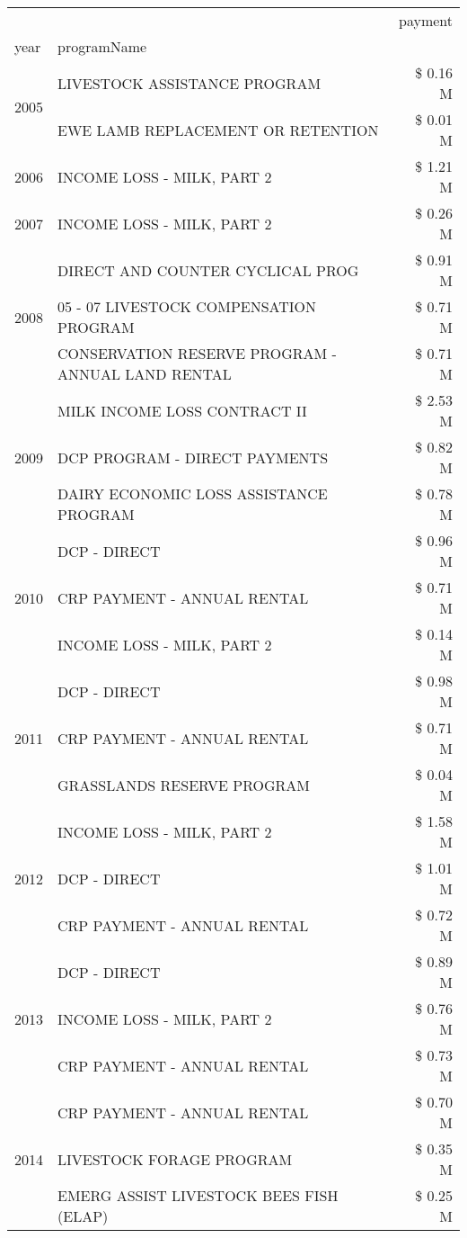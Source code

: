 \begin{tabular}{llr}
\toprule
 &  & payment \\
year & programName &  \\
\midrule
\multirow[t]{2}{*}{2005} & LIVESTOCK ASSISTANCE PROGRAM & \$ 0.16 M \\
 & EWE LAMB REPLACEMENT OR RETENTION & \$ 0.01 M \\
\cline{1-3}
2006 & INCOME LOSS - MILK, PART 2 & \$ 1.21 M \\
\cline{1-3}
2007 & INCOME LOSS - MILK, PART 2 & \$ 0.26 M \\
\cline{1-3}
\multirow[t]{3}{*}{2008} & DIRECT AND COUNTER CYCLICAL PROG & \$ 0.91 M \\
 & 05 - 07 LIVESTOCK COMPENSATION PROGRAM & \$ 0.71 M \\
 & CONSERVATION RESERVE PROGRAM - ANNUAL LAND RENTAL & \$ 0.71 M \\
\cline{1-3}
\multirow[t]{3}{*}{2009} & MILK INCOME LOSS CONTRACT II & \$ 2.53 M \\
 & DCP PROGRAM - DIRECT PAYMENTS & \$ 0.82 M \\
 & DAIRY ECONOMIC LOSS ASSISTANCE PROGRAM & \$ 0.78 M \\
\cline{1-3}
\multirow[t]{3}{*}{2010} & DCP - DIRECT & \$ 0.96 M \\
 & CRP PAYMENT - ANNUAL RENTAL & \$ 0.71 M \\
 & INCOME LOSS - MILK, PART 2 & \$ 0.14 M \\
\cline{1-3}
\multirow[t]{3}{*}{2011} & DCP - DIRECT & \$ 0.98 M \\
 & CRP PAYMENT - ANNUAL RENTAL & \$ 0.71 M \\
 & GRASSLANDS RESERVE PROGRAM & \$ 0.04 M \\
\cline{1-3}
\multirow[t]{3}{*}{2012} & INCOME LOSS - MILK, PART 2 & \$ 1.58 M \\
 & DCP - DIRECT & \$ 1.01 M \\
 & CRP PAYMENT - ANNUAL RENTAL & \$ 0.72 M \\
\cline{1-3}
\multirow[t]{3}{*}{2013} & DCP - DIRECT & \$ 0.89 M \\
 & INCOME LOSS - MILK, PART 2 & \$ 0.76 M \\
 & CRP PAYMENT - ANNUAL RENTAL & \$ 0.73 M \\
\cline{1-3}
\multirow[t]{3}{*}{2014} & CRP PAYMENT - ANNUAL RENTAL & \$ 0.70 M \\
 & LIVESTOCK FORAGE PROGRAM & \$ 0.35 M \\
 & EMERG ASSIST LIVESTOCK BEES FISH (ELAP) & \$ 0.25 M \\

\end{tabular}

